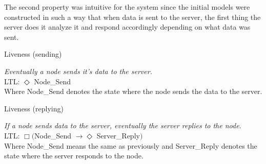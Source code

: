The second property was intuitive for the system since the initial models were constructed in such a way that when data is sent to the server, the first thing the server does it analyze it and respond accordingly depending on what data was sent.  

\begin{definition}{}{}
Liveness (sending)

\textit{Eventually a node sends it's data to the server.} \\

LTL: $\Diamond$ Node\_Send \\

Where Node\_Send denotes the state where the node sends the data to the server. \\
\end{definition} 

\begin{definition}{}{}
Liveness (replying)

\textit{If a node sends data to the server, eventually the server replies to the node.} \\

LTL: $\Box ($Node\_Send $\rightarrow \Diamond$ Server\_Reply$)$ \\

Where Node\_Send means the same as previously and Server\_Reply denotes the state where the server responds to the node.
\end{definition}

